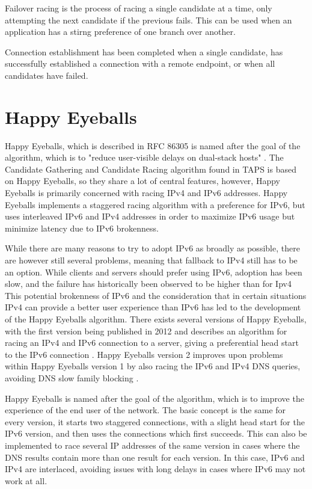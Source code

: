 Failover racing is the process of racing a single candidate
at a time, only attempting the next candidate if the previous
fails. This can be used when an application has a stirng preference
of one branch over another.

Connection establishment has been completed when a single candidate,
has successfully established a connection with a remote endpoint, or
when all candidates have failed. 

\section{Happy Eyeballs} \label{happyEyeballs}
Happy Eyeballs, which is described in RFC 86305 is named after the
goal of the algorithm, which is to "reduce user-visible delays on dual-stack hosts"
\cite{schinaziHappyEyeballsVersion2017}. The Candidate Gathering
and Candidate Racing algorithm found in TAPS is based on Happy Eyeballs,
so they share a lot of central features, however, Happy Eyeballs is
primarily concerned with racing IPv4 and IPv6 addresses.
Happy Eyeballs implements a staggered racing algorithm with a preference for
IPv6, but uses interleaved IPv6 and IPv4 addresses in order to maximize
IPv6 usage but minimize latency due to IPv6 brokenness.

While there are many reasons to try to adopt IPv6 as broadly as
possible, there are however still several problems, meaning that fallback to
IPv4 still has to be an option. While clients and servers should prefer using
IPv6, adoption has been slow, and the failure has historically been
observed to be higher than for Ipv4 %
This potential brokenness of IPv6 and the consideration that in certain
situations IPv4 can provide a better user experience than IPv6
has led to the development of the Happy Eyeballs algorithm.
There exists several versions of Happy Eyeballs, with the
first version being published in 2012 and describes an algorithm
for racing an IPv4 and IPv6 connection to a server, giving a preferential
head start to the IPv6 connection \cite{wingHappyEyeballsSuccess2012}.
Happy Eyeballs version 2 improves
upon problems within Happy Eyeballs version 1 by also racing the
IPv6 and IPv4 DNS queries, avoiding DNS slow family blocking \cite{schinaziHappyEyeballsVersion2017}.

Happy Eyeballs is named after the goal of the algorithm, which
is to improve the experience of the end user of the network.
The basic concept is the same for every version, it
starts two staggered connections, with a slight head start for the IPv6
version, and then uses the connections which first succeeds.
This can also be implemented to race several IP addresses of the
same version in cases where the DNS results contain more than one
result for each version. In this case, IPv6 and IPv4 are interlaced,
avoiding issues with long delays in cases where IPv6 may not work at all.

